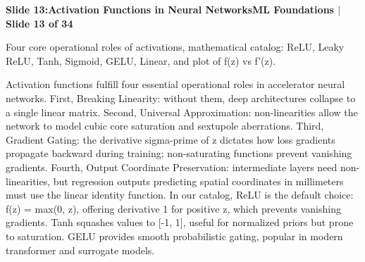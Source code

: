 \documentclass[11pt,a4paper]{article}
\begin{document}
\clearpage
\hypertarget{slide.13}{}
{}
\noindent\begin{tcolorbox}[colback=navy,colframe=navy,left=6pt,right=6pt,top=3pt,bottom=3pt,boxrule=0pt,arc=2pt]
{\large\bfseries\color{white}Slide 13:\enspace Activation Functions in Neural Networks}\hfill{\footnotesize\bfseries\color{white!85!lightbg}ML Foundations \enspace$|$\enspace Slide 13 of 34}
\end{tcolorbox}
\vspace{0.2em}
\begin{tcolorbox}[colback=lightbg,colframe=bordergray,title={\footnotesize\bfseries\color{darkgray}Slide Visual Blueprint},fontupper=\small,left=6pt,right=6pt,top=2.5pt,bottom=2.5pt,boxrule=0.6pt,arc=2.5pt]
Four core operational roles of activations, mathematical catalog: ReLU, Leaky ReLU, Tanh, Sigmoid, GELU, Linear, and plot of f(z) vs f'(z).
\end{tcolorbox}
\vspace{0.2em}
\begin{tcolorbox}[colback=white,colframe=primaryblue,title={\footnotesize\bfseries\color{white}Spoken Presenter Script},fontupper=\small,left=6pt,right=6pt,top=3pt,bottom=3pt,boxrule=0.8pt,arc=2.5pt]
Activation functions fulfill four essential operational roles in accelerator neural networks. First, Breaking Linearity: without them, deep architectures collapse to a single linear matrix. Second, Universal Approximation: non-linearities allow the network to model cubic core saturation and sextupole aberrations. Third, Gradient Gating: the derivative sigma-prime of z dictates how loss gradients propagate backward during training; non-saturating functions prevent vanishing gradients. Fourth, Output Coordinate Preservation: intermediate layers need non-linearities, but regression outputs predicting spatial coordinates in millimeters must use the linear identity function. In our catalog, ReLU is the default choice: f(z) = max(0, z), offering derivative 1 for positive z, which prevents vanishing gradients. Tanh squashes values to [-1, 1], useful for normalized priors but prone to saturation. GELU provides smooth probabilistic gating, popular in modern transformer and surrogate models.
\end{tcolorbox}
\vspace{0.2em}
\end{document}
